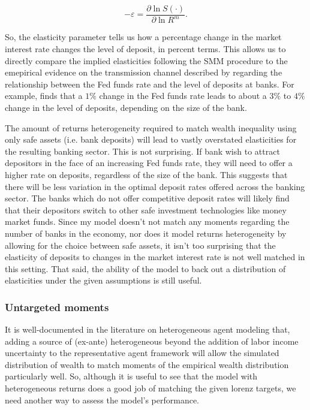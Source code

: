 \[
-\varepsilon = \frac{\partial \ln S(\cdot)}{\partial \ln R^m}. 
\]

\par So, the elasticity parameter tells us how a percentage change in the market interest rate changes the level of deposit, in percent terms. This allows us to directly compare the implied elasticities following the SMM procedure to the emepirical evidence on the transmission channel described by \cite{Drechsler2017} regarding the relationship between the Fed funds rate and the level of deposits at banks. For example, \cite{bastos2004} finds that a $1\%$ change in the Fed funds rate leads to about a  $3\%$ to  $4\%$ change in the level of deposits, depending on the size of the bank.

\par The amount of returns heterogeneity required to match wealth inequality using only safe assets (i.e. bank deposits) will lead to vastly overstated elasticities for the resulting banking sector. This is not surprising. If bank wish to attract depositors in the face of an increasing Fed funds rate, they will need to offer a higher rate on deposits, regardless of the size of the bank. This suggests that there will be less variation in the optimal deposit rates offered across the banking sector. The banks which do not offer competitive deposit rates will likely find that their depositors switch to other safe investment technologies like money market funds. Since my model doesn't not match any moments regarding the number of banks in the economy, nor does it model returns heterogeneity by allowing for the choice between safe assets, it isn't too surprising that the elasticity of deposits to changes in the market interest rate is not well matched in this setting. That said, the ability of the model to back out a distribution of elasticities under the given assumptions is still useful. 

\subsubsection{Untargeted moments}

\par It is well-documented in the literature on heterogeneous agent modeling that, adding a source of (ex-ante) heterogeneous beyond the addition of labor income uncertainty to the representative agent framework will allow the simulated distribution of wealth to match moments of the empirical wealth distribution particularly well. So, although it is useful to see that the model with heterogeneous returns does a good job of matching the given lorenz targets, we need another way to assess the model's performance.

